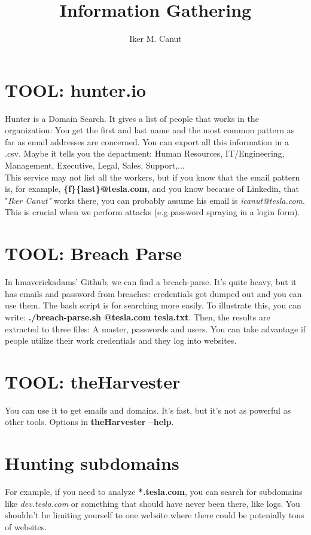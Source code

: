 \documentclass[11pt,a4paper]{article}
\author{Iker M. Canut}
\begin{document}
\title{Information Gathering}
\maketitle
\newpage

\section{TOOL: hunter.io}
Hunter is a Domain Search. It gives a list of people that works in the organization: You get the first and last name and the most common pattern as far as email addresses are concerned. You can export all this information in a .csv. Maybe it tells you the department: Human Resources, IT/Engineering, Management, Executive, Legal, Sales, Support,... \\

This service may not list all the workers, but if you know that the email pattern is, for example, \textbf{\{f\}\{last\}@tesla.com}, and you know because of Linkedin, that "\textit{Iker Canut"} works there, you can probably assume his email is \textit{icanut@tesla.com}. This is crucial when we perform attacks (e.g password spraying in a login form).

\section{TOOL: Breach Parse}
In hmaverickadams' Github, we can find a breach-parse. It's quite heavy, but it has emails and password from breaches: credentials got dumped out and you can use them. The bash script is for searching more easily. To illustrate this, you can write: \textbf{./breach-parse.sh @tesla.com tesla.txt}. Then, the results are extracted to three files: A master, passwords and users. You can take advantage if people utilize their work credentials and they log into websites.

\section{TOOL: theHarvester}
You can use it to get emails and domains. It's fast, but it's not as powerful as other tools. Options in \textbf{theHarvester --help}.

\section{Hunting subdomains}
For example, if you need to analyze \textbf{*.tesla.com}, you can search for subdomains like \textit{dev.tesla.com} or something that should have never been there, like logs. You shouldn't be limiting yourself to one website where there could be potenially tons of websites.
\end{document}
